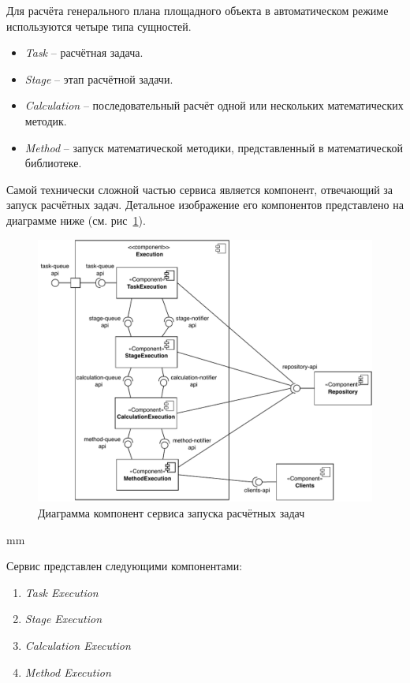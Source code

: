 Для расчёта генерального плана площадного объекта в автоматическом режиме используются четыре типа сущностей.
\begin{itemize}
	\item {
		\textit{Task} -- расчётная задача.
	}
	\item {
		\textit{Stage} -- этап расчётной задачи.
	}
	\item {
		\textit{Calculation} -- последовательный расчёт одной или нескольких математических методик.
	}
	\item {
		\textit{Method} -- запуск математической методики, представленный в математической библиотеке.
	}
\end{itemize}

Самой технически сложной частью сервиса является компонент, отвечающий за запуск расчётных задач.
Детальное изображение его компонентов представлено
на диаграмме ниже (см. рис\ \ref{pic:architecture__orchestrator-detailed-component}).

\begin{figure}[H]
	\hspace*{-2.5 cm}\includegraphics[width=\textwidth]{architecture/pictures/orchestrator/component_detailed}
	\caption{Диаграмма компонент сервиса запуска расчётных задач}
	\label{pic:architecture__orchestrator-detailed-component}
\end{figure}
 mm


Сервис представлен следующими компонентами:
\begin{enumerate}
	\item {
		\textit{Task Execution}
	}
	\item {
		\textit{Stage Execution}
	}
	\item {
		\textit{Calculation Execution}
	}
	\item {
		\textit{Method Execution}
	}
\end{enumerate}
